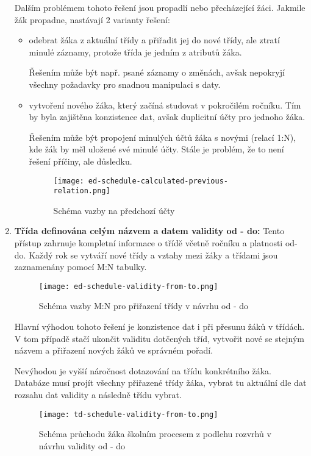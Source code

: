 \begin{enumerate}
    Dalším problémem tohoto řešení jsou propadlí nebo přecházející žáci. Jakmile žák propadne, nastávají 2 varianty řešení:
    \begin{itemize}
        \item odebrat žáka z aktuální třídy a přiřadit jej do nové třídy, ale ztratí minulé záznamy, protože třída je jedním z atributů žáka.

        Řešením může být např. psané záznamy o změnách, avšak nepokryjí všechny požadavky pro snadnou manipulaci s daty.
        \item vytvoření nového žáka, který začíná studovat v pokročilém ročníku. Tím by byla zajištěna konzistence dat, avšak duplicitní účty pro jednoho žáka.

        Řešením může být propojení minulých účtů žáka s novými (relací 1:N), kde žák by měl uložené své minulé účty. Stále je problém, že to není řešení příčiny, ale důsledku.
        \begin{figure}[H]
            \centering
            \texttt{[image: ed-schedule-calculated-previous-relation.png]}
            \caption{Schéma vazby na předchozí účty}
            \label{fig:ed-schedule-calculated-previous-relation}
        \end{figure}
    \end{itemize}

    \newpage
    \item \textbf{Třída definována celým názvem a datem validity od - do:}
    \label{item:class-implementation-from-to-validity} Tento přístup zahrnuje kompletní informace o třídě včetně ročníku a platnosti od-do. Každý rok se vytváří nové třídy a vztahy mezi žáky a třídami jsou zaznamenány pomocí M:N tabulky.

    \begin{figure}[H]
        \centering
        \texttt{[image: ed-schedule-validity-from-to.png]}
        \caption{Schéma vazby M:N pro přiřazení třídy v návrhu od - do}
        \label{fig:ed-schedule-validity-from-to}
    \end{figure}
    
    Hlavní výhodou tohoto řešení je konzistence dat i při přesunu žáků v třídách. V tom případě stačí ukončit validitu dotčených tříd, vytvořit nové se stejným názvem a přiřazení nových žáků ve správném pořadí.

    Nevýhodou je vyšší náročnost dotazování na třídu konkrétního žáka. Databáze musí projít všechny přiřazené třídy žáka, vybrat tu aktuální dle dat rozsahu dat validity a následně třídu vybrat.

    \begin{figure}[H]
        \centering
        \texttt{[image: td-schedule-validity-from-to.png]}
        \caption{Schéma průchodu žáka školním procesem z podlehu rozvrhů v návrhu validity od - do}
        \label{fig:td-schedule-validity-from-to}
    \end{figure}
\end{enumerate}

